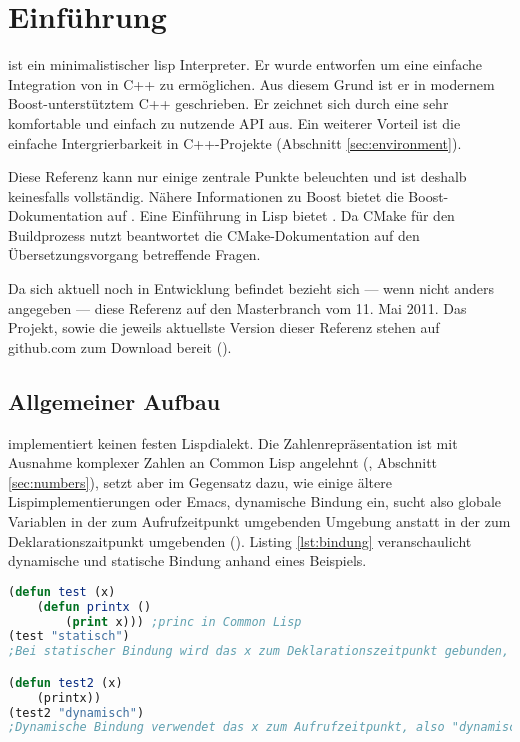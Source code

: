 \section{Einführung}
\label{sec:einfuehrung}

\projectname{} ist ein minimalistischer lisp Interpreter. Er wurde entworfen um eine einfache
Integration von in C++ zu ermöglichen. Aus diesem Grund ist er in modernem Boost-unterstütztem
C++ geschrieben. Er zeichnet sich durch eine sehr komfortable und einfach zu nutzende API aus.
Ein weiterer Vorteil ist die einfache Intergrierbarkeit in C++-Projekte (Abschnitt \ref{sec:environment}).

Diese Referenz kann nur einige zentrale Punkte beleuchten und ist deshalb keinesfalls vollständig. Nähere Informationen zu Boost bietet die Boost-Do\-ku\-men\-ta\-tion auf \cite{smart_ptr_online}. Eine Einführung in Lisp bietet \cite{graham_ansi_1995}. Da \projectname{} CMake für den Buildprozess nutzt beantwortet die CMake-Dokumentation auf \cite{cmake_online} den Übersetzungsvorgang betreffende Fragen.

Da sich \projectname{} aktuell noch in Entwicklung befindet bezieht sich --- wenn nicht anders angegeben --- diese Referenz auf den Masterbranch vom 11. Mai 2011.
Das Projekt, sowie die jeweils aktuellste Version dieser Referenz stehen auf github.com zum Download bereit (\cite{lisp_interaction_online}\cite{lisp_interaction_ref_online}). %

\subsection{Allgemeiner Aufbau}


\projectname{} implementiert keinen festen Lispdialekt. Die Zahlenrepräsentation ist mit Ausnahme komplexer Zahlen an Common Lisp angelehnt (\cite[S. 143ff]{graham_ansi_1995}, Abschnitt \ref{sec:numbers}), setzt aber im Gegensatz dazu, wie einige ältere Lispimplementierungen oder Emacs, dynamische Bindung ein, sucht also globale Variablen in der zum Aufrufzeitpunkt umgebenden Umgebung anstatt in der zum Deklarationszaitpunkt umgebenden (\cite[36, 63]{wilhelm_uebersetzerbau_2007}\cite[112]{graham_ansi_1995}). Listing \ref{lst:bindung} veranschaulicht dynamische und statische Bindung anhand eines Beispiels.

\begin{lstlisting}[caption={dynamische Bindung}, label=lst:bindung, language=Lisp]
(defun test (x)
    (defun printx ()
        (print x))) ;princ in Common Lisp
(test "statisch")
;Bei statischer Bindung wird das x zum Deklarationszeitpunkt gebunden, also "statisch"

(defun test2 (x)
    (printx))
(test2 "dynamisch")
;Dynamische Bindung verwendet das x zum Aufrufzeitpunkt, also "dynamisch"
\end{lstlisting}

